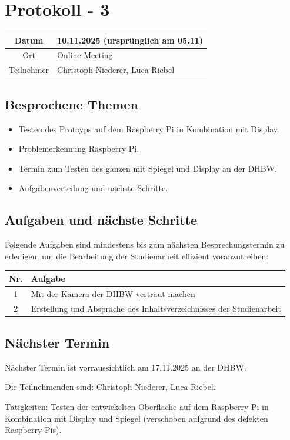 \chapter{Protokoll - 3}

\begin{table}[H]
    \centering
    \begin{tabular}{|c|l|}
        \hline
        Datum& 10.11.2025 (ursprünglich am 05.11)\\
        \hline
        Ort& Online-Meeting\\
        \hline
        Teilnehmer& Christoph Niederer, Luca Riebel\\
        \hline
    \end{tabular}
\end{table}

\section{Besprochene Themen}
\begin{itemize}
    \item Testen des Protoyps auf dem Raspberry Pi in Kombination mit Display.
    \item Problemerkennung Raspberry Pi.
    \item Termin zum Testen des ganzen mit Spiegel und Display an der DHBW.
    \item Aufgabenverteilung und nächste Schritte.
\end{itemize}

\section{Aufgaben und nächste Schritte}
Folgende Aufgaben sind mindestens bis zum nächsten Besprechungstermin zu erledigen, um die Bearbeitung der Studienarbeit effizient voranzutreiben:

\begin{table}[H]
    \centering
    \begin{tabular}{|c|p{12cm}|}
        \hline
        \textbf{Nr.} & \textbf{Aufgabe}\\
        \hline
        1 & Mit der Kamera der DHBW vertraut machen\\
        \hline
        2 & Erstellung und Absprache des Inhaltsverzeichnisses der Studienarbeit\\
        \hline
    \end{tabular}
\end{table}

\section{Nächster Termin}
Nächster Termin ist vorraussichtlich am 17.11.2025 an der DHBW.

Die Teilnehmenden sind: Christoph Niederer, Luca Riebel. 

Tätigkeiten: Testen der entwickelten Oberfläche auf dem Raspberry Pi in Kombination mit Display und Spiegel (verschoben aufgrund des defekten Raspberry Pis).
